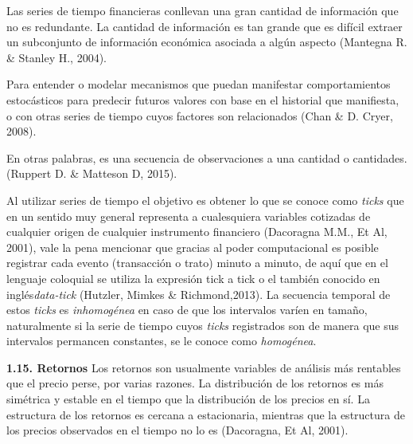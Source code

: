 Las series de tiempo financieras conllevan una gran cantidad de información que no es redundante. La cantidad de información es tan grande que es difícil extraer un subconjunto de información económica asociada a algún aspecto (Mantegna R. \& Stanley H., 2004).

Para entender o modelar mecanismos que puedan manifestar comportamientos estocásticos para predecir futuros valores con base en el historial que manifiesta, o con otras series de tiempo cuyos factores son relacionados (Chan \& D. Cryer, 2008).  
\newline

En otras palabras, es una secuencia de observaciones a una cantidad o cantidades. (Ruppert D. \& Matteson D, 2015). 
\newline

Al utilizar series de tiempo el objetivo es obtener lo que se conoce como \newline \guillemotleft \textit{ticks} \guillemotright \hspace{0.12cm} que en un sentido muy general representa a cualesquiera variables cotizadas de cualquier origen de cualquier instrumento financiero (Dacoragna M.M., Et Al, 2001), vale la pena mencionar que gracias al poder computacional es posible registrar cada evento (transacción o trato) minuto a minuto, de aquí que en el lenguaje coloquial se utiliza la expresión \guillemotleft tick a tick \guillemotright o el también conocido en inglés\textit{data-tick}  (Hutzler, Mimkes \& Richmond,2013). La secuencia temporal de estos \textit{ticks} es \textit{inhomogénea} en caso de que los intervalos varíen en tamaño, naturalmente si la serie de tiempo cuyos \textit{ticks} registrados son de manera que sus intervalos permancen constantes, se le conoce como \textit{homogénea}. \newline



{
\noindent
\Large  \textbf{1.15. Retornos} 
}
\newline
Los retornos son usualmente variables de análisis más rentables que el precio perse, por varias razones. La distribución de los retornos es más simétrica y estable en el tiempo que la distribución de los precios en sí. La estructura de los retornos es cercana a estacionaria, mientras que la estructura de los precios observados en el tiempo no lo es (Dacoragna, Et Al, 2001).
\newpage

